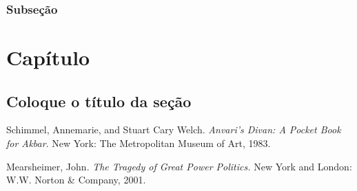 \documentclass[a4paper,numbers=noenddot,DIV=calc]{scrbook} %
\begin{document}
\subsection{Subseção}

\lipsum[1-5] %


\chapter{Capítulo}
\section{Coloque o título da seção}
\lipsum[1-5]


\setlength{\parindent}{0pt}

Schimmel, Annemarie, and Stuart Cary Welch. \textit{Anvari's Divan: A Pocket Book for Akbar}.  New York: The Metropolitan Museum of Art, 1983.

\setlength{\parskip}{10pt} %

Mearsheimer, John. \textit{The Tragedy of Great Power Politics.} New York and London: W.W. Norton \& Company, 2001.
\end{document}
